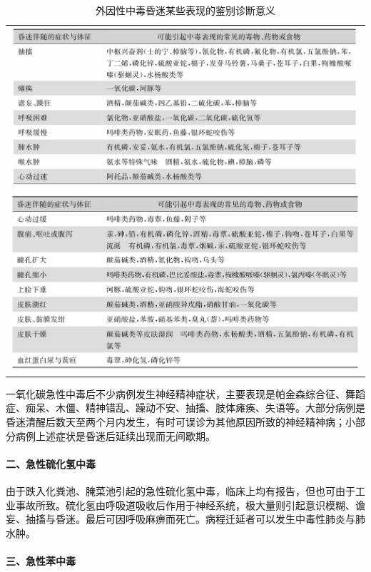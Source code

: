 \begin{longtable}{c}
 \caption{外因性中毒昏迷某些表现的鉴别诊断意义}
 \label{tab49-3}
 \endfirsthead
 \caption[]{外因性中毒昏迷某些表现的鉴别诊断意义}
 \endhead
 \includegraphics[width=\textwidth,height=\textheight,keepaspectratio]{./images/Image00308.jpg}\\
 \includegraphics[width=\textwidth,height=\textheight,keepaspectratio]{./images/Image00309.jpg}
 \end{longtable}

一氧化碳急性中毒后不少病例发生神经精神症状，主要表现是帕金森综合征、舞蹈症、痴呆、木僵、精神错乱、躁动不安、抽搐、肢体瘫痪、失语等。大部分病例是昏迷清醒后数天至两个月内发生，有时可误诊为其他原因所致的神经精神病；小部分病例上述症状是昏迷后延续出现而无间歇期。

\paragraph{二、急性硫化氢中毒}

由于跌入化粪池、腌菜池引起的急性硫化氢中毒，临床上均有报告，但也可由于工业事故所致。硫化氢由呼吸道吸收后作用于神经系统，极大量则引起意识模糊、谵妄、抽搐与昏迷。最后可因呼吸麻痹而死亡。病程迁延者可以发生中毒性肺炎与肺水肿。

\paragraph{三、急性苯中毒}

